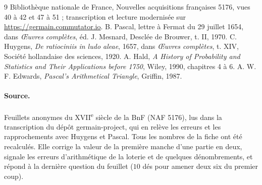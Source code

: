 \documentclass[11pt,a4paper]{article}
\theoremstyle{plain}
\theoremstyle{definition}
\theoremstyle{remark}
\begin{document}
\begin{thebibliography}{9}
 Bibliothèque nationale de France, Nouvelles acquisitions françaises 5176, vues 40 à 42 et 47 à 51 ; transcription et lecture modernisée sur \url{https://germain.commutator.io}.
 B. Pascal, lettre à Fermat du 29 juillet 1654, dans \emph{Œuvres complètes}, éd. J. Mesnard, Desclée de Brouwer, t. II, 1970.
 C. Huygens, \emph{De ratiociniis in ludo aleae}, 1657, dans \emph{Œuvres complètes}, t. XIV, Société hollandaise des sciences, 1920.
 A. Hald, \emph{A History of Probability and Statistics and Their Applications before 1750}, Wiley, 1990, chapitres 4 à 6.
 A. W. F. Edwards, \emph{Pascal's Arithmetical Triangle}, Griffin, 1987.
\end{thebibliography}

\paragraph{Source.} Feuillets anonymes du XVII\textsuperscript{e} siècle de la BnF (NAF 5176), lus dans la transcription du dépôt germain-project, qui en relève les erreurs et les rapprochements avec Huygens et Pascal. Tous les nombres de la fiche ont été recalculés. Elle corrige la valeur de la première manche d'une partie en deux, signale les erreurs d'arithmétique de la loterie et de quelques dénombrements, et répond à la dernière question du feuillet ($10$ dés pour amener deux six du premier coup).
\end{document}

